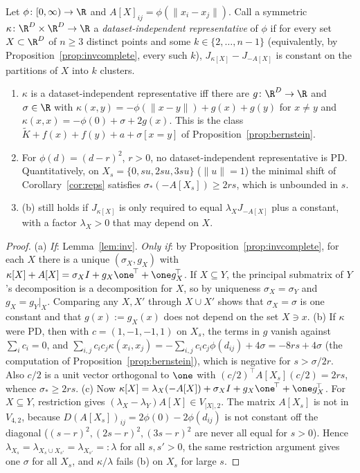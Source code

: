 \begin{corollary}\label{cor:rest}
Let $\phi\colon[0,\infty)\to\R$ and $A[X]_{ij}=\phi(\lVert x_i-x_j\rVert)$. Call a symmetric $\kappa\colon\R^D\times\R^D\to\R$ a \emph{dataset-independent representative} of $\phi$ if for every set $X\subset\R^D$ of $n\ge3$ distinct points and some $k\in\{2,\dots,n-1\}$ (equivalently, by Proposition~\ref{prop:invcomplete}, every such $k$), $J_{\kappa[X]}-J_{-A[X]}$ is constant on the partitions of $X$ into $k$ clusters.
\begin{enumerate}[label=(\alph*),leftmargin=2em]
\item $\kappa$ is a dataset-independent representative iff there are $g\colon\R^D\to\R$ and $\sigma\in\R$ with $\kappa(x,y)=-\phi(\lVert x-y\rVert)+g(x)+g(y)$ for $x\ne y$ and $\kappa(x,x)=-\phi(0)+\sigma+2g(x)$. This is the class $\widetilde K+f(x)+f(y)+a+\sigma[x=y]$ of Proposition~\ref{prop:bernstein}.
\item For $\phi(d)=(d-r)^2$, $r>0$, no dataset-independent representative is PD. Quantitatively, on $X_s=\{0,su,2su,3su\}$ ($\lVert u\rVert=1$) the minimal shift of Corollary~\ref{cor:reps} satisfies $\sigma_*(-A[X_s])\ge2rs$, which is unbounded in $s$.
\item (b) still holds if $J_{\kappa[X]}$ is only required to equal $\lambda_XJ_{-A[X]}$ plus a constant, with a factor $\lambda_X>0$ that may depend on $X$.
\end{enumerate}
\end{corollary}
\begin{proof}
(a) \emph{If}: Lemma~\ref{lem:inv}. \emph{Only if}: by Proposition~\ref{prop:invcomplete}, for each $X$ there is a unique $(\sigma_X,g_X)$ with $\kappa[X]+A[X]=\sigma_XI+g_X\one^{\!\top}+\one g_X^{\!\top}$. If $X\subseteq Y$, the principal submatrix of $Y$'s decomposition is a decomposition for $X$, so by uniqueness $\sigma_X=\sigma_Y$ and $g_X=g_Y|_X$. Comparing any $X,X'$ through $X\cup X'$ shows that $\sigma_X=\sigma$ is one constant and that $g(x):=g_X(x)$ does not depend on the set $X\ni x$. (b) If $\kappa$ were PD, then with $c=(1,-1,-1,1)$ on $X_s$, the terms in $g$ vanish against $\sum_ic_i=0$, and $\sum_{i,j}c_ic_j\kappa(x_i,x_j)=-\sum_{i,j}c_ic_j\phi(d_{ij})+4\sigma=-8rs+4\sigma$ (the computation of Proposition~\ref{prop:bernstein}), which is negative for $s>\sigma/2r$. Also $c/2$ is a unit vector orthogonal to $\one$ with $(c/2)^{\!\top}A[X_s](c/2)=2rs$, whence $\sigma_*\ge2rs$. (c) Now $\kappa[X]=\lambda_X(-A[X])+\sigma_XI+g_X\one^{\!\top}+\one g_X^{\!\top}$. For $X\subseteq Y$, restriction gives $(\lambda_X-\lambda_Y)A[X]\in V_{|X|,2}$. The matrix $A[X_s]$ is not in $V_{4,2}$, because $D(A[X_s])_{ij}=2\phi(0)-2\phi(d_{ij})$ is not constant off the diagonal ($(s-r)^2,(2s-r)^2,(3s-r)^2$ are never all equal for $s>0$). Hence $\lambda_{X_s}=\lambda_{X_s\cup X_{s'}}=\lambda_{X_{s'}}=:\lambda$ for all $s,s'>0$, the same restriction argument gives one $\sigma$ for all $X_s$, and $\kappa/\lambda$ fails (b) on $X_s$ for large $s$.
\end{proof}

